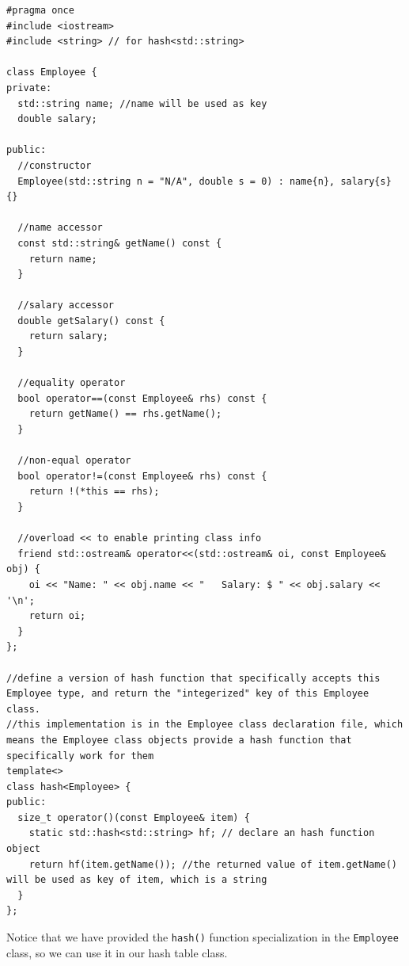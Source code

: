 \documentclass[12pt]{book}
\begin{document}
\begin{verbatim}
#pragma once
#include <iostream>
#include <string> // for hash<std::string>

class Employee {
private:
  std::string name; //name will be used as key
  double salary;

public:
  //constructor
  Employee(std::string n = "N/A", double s = 0) : name{n}, salary{s} {}

  //name accessor
  const std::string& getName() const {
    return name;
  }

  //salary accessor 
  double getSalary() const {
    return salary;
  }

  //equality operator
  bool operator==(const Employee& rhs) const {
    return getName() == rhs.getName();
  }

  //non-equal operator
  bool operator!=(const Employee& rhs) const {
    return !(*this == rhs);
  }

  //overload << to enable printing class info
  friend std::ostream& operator<<(std::ostream& oi, const Employee& obj) {
    oi << "Name: " << obj.name << "   Salary: $ " << obj.salary << '\n';
    return oi;
  } 
};

//define a version of hash function that specifically accepts this Employee type, and return the "integerized" key of this Employee class.
//this implementation is in the Employee class declaration file, which means the Employee class objects provide a hash function that specifically work for them
template<>
class hash<Employee> {
public:
  size_t operator()(const Employee& item) {
    static std::hash<std::string> hf; // declare an hash function object 
    return hf(item.getName()); //the returned value of item.getName() will be used as key of item, which is a string
  }
};
\end{verbatim}

Notice that we have provided the \texttt{hash()} function specialization in the \texttt{Employee} class, so we can use it in our hash table class.
\end{document}
